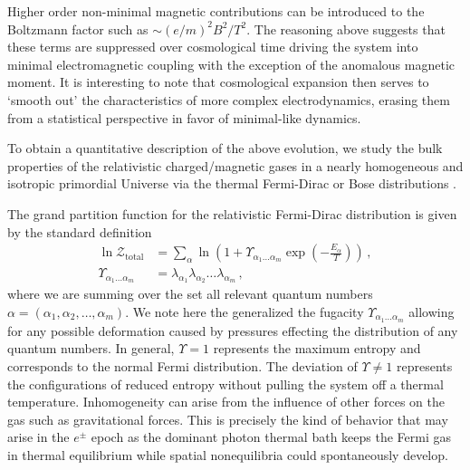 Higher order non-minimal magnetic contributions can be introduced to the Boltzmann factor such as $\sim(e/m)^{2}B^{2}/T^{2}$. The reasoning above suggests that these terms are suppressed over cosmological time driving the system into minimal electromagnetic coupling with the exception of the anomalous magnetic moment. It is interesting to note that cosmological expansion then serves to `smooth out' the characteristics of more complex electrodynamics, erasing them from a statistical perspective in favor of minimal-like dynamics.

\label{sec:partition}
\noindent To obtain a quantitative description of the above evolution, we study the bulk properties of the relativistic charged/magnetic gases in a nearly homogeneous and isotropic primordial Universe via the thermal Fermi-Dirac or Bose distributions .

The grand partition function for the relativistic Fermi-Dirac distribution is given by the standard definition~\cite{Elze:1980er}
\begin{align}
 \label{part:1} \ln\mathcal{Z}_\mathrm{total} &= \sum_{\alpha}\ln\left(1+\Upsilon_{\alpha_{1}\ldots\alpha_{m}}\exp\left(-\frac{E_{\alpha}}{T}\right)\right)\,,\\
 \Upsilon_{\alpha_{1}\ldots\alpha_{m}} &= \lambda_{\alpha_{1}}\lambda_{\alpha_{2}}\ldots\lambda_{\alpha_{m}}\,,
\end{align}
where we are summing over the set all relevant quantum numbers $\alpha=(\alpha_{1},\alpha_{2},\ldots,\alpha_{m})$. We note here the generalized the fugacity $\Upsilon_{\alpha_{1}\ldots\alpha_{m}}$ allowing for any possible deformation caused by pressures effecting the distribution of any quantum numbers. In general, $\Upsilon=1$ represents the maximum entropy and corresponds to the normal Fermi distribution. The deviation of $\Upsilon\neq1$ represents the configurations of reduced entropy without pulling the system off a thermal temperature. Inhomogeneity can arise from the influence of other forces on the gas such as gravitational forces. This is precisely the kind of behavior that may arise in the $e^{\pm}$ epoch as the dominant photon thermal bath keeps the Fermi gas in thermal equilibrium while spatial nonequilibria could spontaneously develop.

